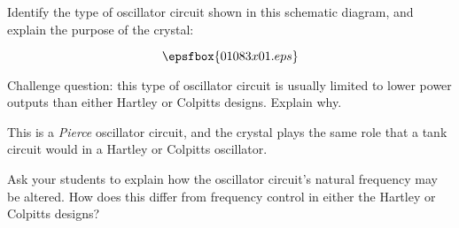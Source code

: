 

Identify the type of oscillator circuit shown in this schematic diagram, and explain the purpose of the crystal:

$$\epsfbox{01083x01.eps}$$

Challenge question: this type of oscillator circuit is usually limited to lower power outputs than either Hartley or Colpitts designs.  Explain why.







This is a {\it Pierce} oscillator circuit, and the crystal plays the same role that a tank circuit would in a Hartley or Colpitts oscillator.







Ask your students to explain how the oscillator circuit's natural frequency may be altered.  How does this differ from frequency control in either the Hartley or Colpitts designs?




